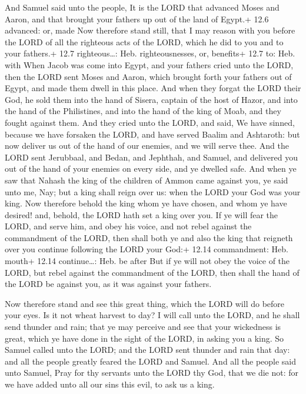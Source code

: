  And Samuel said unto the people, It is the LORD that
advanced Moses and Aaron, and that brought your fathers up out of the
land of Egypt.+ 12.6 advanced: or, made  Now therefore stand
still, that I may reason with you before the LORD of all the righteous
acts of the LORD, which he did to you and to your fathers.+ 12.7
righteous\ldots: Heb. righteousnesses, or, benefits+ 12.7 to: Heb. with
 When Jacob was come into Egypt, and your fathers cried unto
the LORD, then the LORD sent Moses and Aaron, which brought forth your
fathers out of Egypt, and made them dwell in this place. 
And when they forgat the LORD their God, he sold them into the hand of
Sisera, captain of the host of Hazor, and into the hand of the
Philistines, and into the hand of the king of Moab, and they fought
against them.  And they cried unto the LORD, and said, We
have sinned, because we have forsaken the LORD, and have served Baalim
and Ashtaroth: but now deliver us out of the hand of our enemies, and we
will serve thee.  And the LORD sent Jerubbaal, and Bedan,
and Jephthah, and Samuel, and delivered you out of the hand of your
enemies on every side, and ye dwelled safe.  And when ye
saw that Nahash the king of the children of Ammon came against you, ye
said unto me, Nay; but a king shall reign over us: when the LORD your
God was your king.  Now therefore behold the king whom ye
have chosen, and whom ye have desired! and, behold, the LORD hath set a
king over you.  If ye will fear the LORD, and serve him,
and obey his voice, and not rebel against the commandment of the LORD,
then shall both ye and also the king that reigneth over you continue
following the LORD your God:+ 12.14 commandment: Heb. mouth+ 12.14
continue\ldots: Heb. be after  But if ye will not obey the
voice of the LORD, but rebel against the commandment of the LORD, then
shall the hand of the LORD be against you, as it was against your
fathers.

 Now therefore stand and see this great thing, which the
LORD will do before your eyes.  Is it not wheat harvest to
day? I will call unto the LORD, and he shall send thunder and rain; that
ye may perceive and see that your wickedness is great, which ye have
done in the sight of the LORD, in asking you a king.  So
Samuel called unto the LORD; and the LORD sent thunder and rain that
day: and all the people greatly feared the LORD and Samuel.
 And all the people said unto Samuel, Pray for thy servants
unto the LORD thy God, that we die not: for we have added unto all our
sins this evil, to ask us a king.

